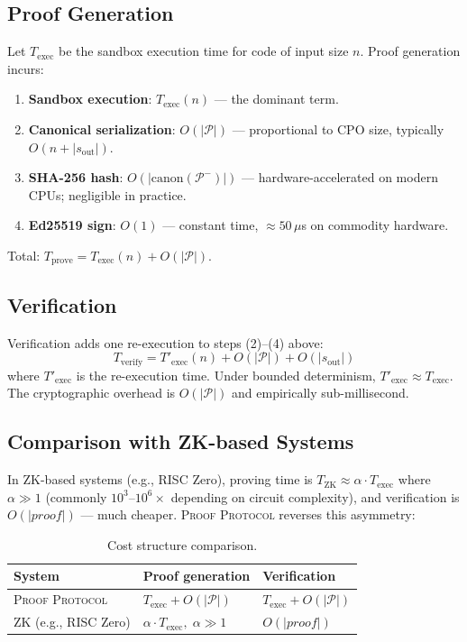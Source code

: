 \documentclass[11pt]{article}
\begin{document}
\subsection{Proof Generation}

Let $T_{\mathrm{exec}}$ be the sandbox execution time for code of input
size $n$.  Proof generation incurs:

\begin{enumerate}
  \item \textbf{Sandbox execution}: $T_{\mathrm{exec}}(n)$ — the dominant term.
  \item \textbf{Canonical serialization}: $O(|\mathcal{P}|)$ — proportional
        to CPO size, typically $O(n + |s_{\mathrm{out}}|)$.
  \item \textbf{SHA-256 hash}: $O(|\mathrm{canon}(\mathcal{P}^-)|)$ —
        hardware-accelerated on modern CPUs; negligible in practice.
  \item \textbf{Ed25519 sign}: $O(1)$ — constant time, $\approx 50\,\mu$s
        on commodity hardware.
\end{enumerate}

Total: $T_{\mathrm{prove}} = T_{\mathrm{exec}}(n) + O(|\mathcal{P}|)$.

\subsection{Verification}

Verification adds one re-execution to steps (2)--(4) above:
\[
  T_{\mathrm{verify}} = T'_{\mathrm{exec}}(n) + O(|\mathcal{P}|)
                       + O(|s_{\mathrm{out}}|)
\]
where $T'_{\mathrm{exec}}$ is the re-execution time.  Under bounded
determinism, $T'_{\mathrm{exec}} \approx T_{\mathrm{exec}}$.  The
cryptographic overhead is $O(|\mathcal{P}|)$ and empirically sub-millisecond.

\subsection{Comparison with ZK-based Systems}

In ZK-based systems (e.g., RISC Zero), proving time is
$T_{\mathrm{ZK}} \approx \alpha \cdot T_{\mathrm{exec}}$ where
$\alpha \gg 1$ (commonly $10^3$--$10^6\times$ depending on circuit complexity),
and verification is $O(|proof|)$ — much cheaper.
\textsc{Proof Protocol} reverses this asymmetry:

\begin{table}[h]
\centering
\caption{Cost structure comparison.}
\label{tab:cost}
\begin{tabular}{lll}
\toprule
\textbf{System} & \textbf{Proof generation} & \textbf{Verification} \\
\midrule
\textsc{Proof Protocol} & $T_{\mathrm{exec}} + O(|\mathcal{P}|)$
                         & $T_{\mathrm{exec}} + O(|\mathcal{P}|)$ \\
ZK (e.g., RISC Zero)    & $\alpha \cdot T_{\mathrm{exec}},\; \alpha \gg 1$
                         & $O(|\textit{proof}|)$                    \\
\bottomrule
\end{tabular}
\end{table}
\end{document}
